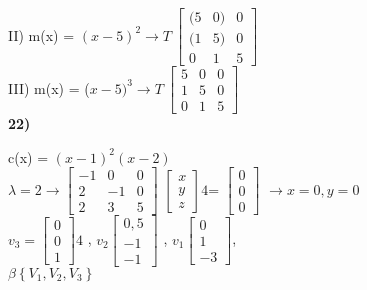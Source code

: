 \documentclass[a4paper,12pt]{report}
\begin{document}
II) m(x) = $(x-5)^2 \rightarrow T ~ \left [\begin{array}{rrr}
(5&0)&0\\
(1&5)&0\\
0&1&5
\end{array}\right]$ \\

III) m(x) = ($x-5)^3 \rightarrow T ~ \left [\begin{array}{rrr}
5&0&0\\
1&5&0\\
0&1&5
\end{array}\right]$  \\





\textbf{22)}

c(x) = $(x - 1)^2(x-2)$\\

$\lambda = 2 \rightarrow  \left [\begin{array}{rrr}
-1&0&0\\
2&-1&0\\
2&3&5
\end{array}\right]$  
$\left [\begin{array}{rrr} x\\ y\\ z \end{array}\right]4 $= 
$\left [\begin{array}{rrr} 0\\ 0\\ 0 \end{array}\right] $
$\rightarrow { x= 0, y = 0}$ \\

$v_3= \left [\begin{array}{rrr} 0\\0\\ 1 \end{array}\right]4$ , 
$v_2 \left [\begin{array}{rrr} 0,5\\ -1\\ -1 \end{array}\right]$ , 
$ v_1 \left [\begin{array}{rrr} 0\\ 1\\  -3 \end{array}\right] $, \\
$ \beta \left \{ V_1, V_2,V_3 \right \}$ \\
\end{document}
